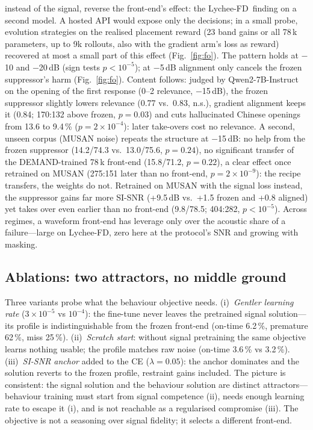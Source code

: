 \documentclass{article}
\newcommand{\lfd}{Lychee-FD}
\begin{document}
instead of the signal, reverse the front-end's effect: the \lfd\ finding on a second model. A hosted API would expose only the decisions; in a small probe, evolution strategies on the realised placement reward (23 band gains or all 78\,k parameters, up to 9k rollouts, also with the gradient arm's loss as reward) recovered at most a small part of this effect (Fig.~\ref{fig:fo}). The pattern holds at $-$10 and $-$20\,dB (sign tests $p<10^{-5}$); at $-$5\,dB alignment only cancels the frozen suppressor's harm (Fig.~\ref{fig:fo}). Content follows: judged by Qwen2-7B-Instruct on the opening of the first response (0--2 relevance, $-$15\,dB), the frozen suppressor slightly lowers relevance (0.77 vs.\ 0.83, n.s.), gradient alignment keeps it (0.84; 170:132 above frozen, $p=0.03$) and cuts hallucinated Chinese openings from 13.6 to 9.4\,\% ($p=2{\times}10^{-4}$): later take-overs cost no relevance. A second, unseen corpus (MUSAN noise) repeats the structure at $-$15\,dB: no help from the frozen suppressor (14.2/74.3 vs.\ 13.0/75.6, $p=0.24$), no significant transfer of the DEMAND-trained 78\,k front-end (15.8/71.2, $p=0.22$), a clear effect once retrained on MUSAN (275:151 later than no front-end, $p=2{\times}10^{-9}$): the recipe transfers, the weights do not. Retrained on MUSAN with the signal loss instead, the suppressor gains far more SI-SNR (+9.5\,dB vs.\ +1.5 frozen and +0.8 aligned) yet takes over even earlier than no front-end (9.8/78.5; 404:282, $p<10^{-5}$). Across regimes, a waveform front-end has leverage only over the acoustic share of a
failure---large on \lfd, zero here at the protocol's SNR and growing with masking.

\subsection{Ablations: two attractors, no middle ground}
\label{sec:abl}
Three variants probe what the behaviour objective needs. (i)~\emph{Gentler learning rate}
($3{\times}10^{-5}$ vs $10^{-4}$): the fine-tune never leaves the pretrained signal
solution---its profile is indistinguishable from the frozen front-end (on-time 6.2\,\%,
premature 62\,\%, miss 25\,\%). (ii)~\emph{Scratch start}: without signal pretraining the same
objective learns nothing usable; the profile matches raw noise (on-time 3.6\,\% vs 3.2\,\%).
(iii)~\emph{SI-SNR anchor} added to the CE ($\lambda{=}0.05$): the anchor dominates and the
solution reverts to the frozen profile, restraint gains included. The picture is consistent:
the signal solution and the behaviour solution are distinct attractors---behaviour training
must start from signal competence (ii), needs enough learning rate to escape it (i), and is
not reachable as a regularised compromise (iii). The objective is not a seasoning over signal
fidelity; it selects a different front-end.
\end{document}
